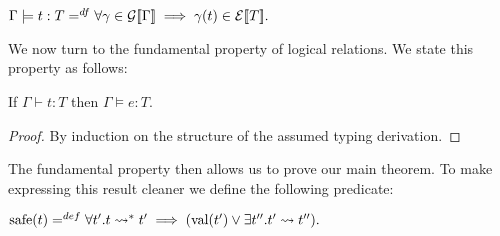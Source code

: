 \begin{center}
  \begin{math}
    \Gamma \models t : T =^{df} \forall \gamma \in \mathcal{G}[\negthinspace[\Gamma]\negthinspace] \implies
    \gamma(t) \in \mathcal{E}[\negthinspace[T]\negthinspace].
  \end{math}
\end{center}
\noindent
We now turn to the fundamental property of logical relations.  We state this property as
follows:
\begin{lemma}
  \label{lemma:fundamental_property}
  If $\Gamma \vdash t : T$ then $\Gamma \models e : T$.
\end{lemma}
\begin{proof}
  By induction on the structure of the assumed typing derivation.
\end{proof}
\noindent
The fundamental property then allows us to prove our main theorem.  To make
expressing this result cleaner we define the following predicate:
\begin{center}
  \begin{math}
    \text{safe}(t) =^{def} \forall t'.t \rightsquigarrow^* t' \implies (\text{val}(t') \lor \exists t''.t' \rightsquigarrow t'').
  \end{math}
\end{center}

